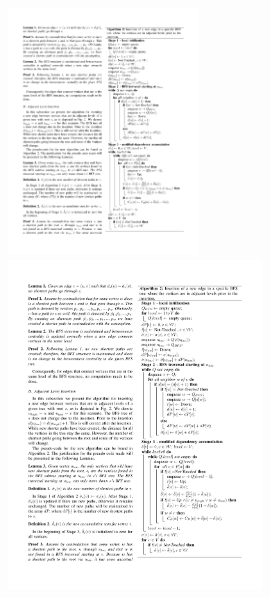 \begin{frame}
\begin{columns}[onlytextwidth]
    \begin{column}{0.7\textwidth}
      \begin{figure}[t]
        \centering
        \includegraphics[width=0.45\textwidth, height=0.8\textheight, keepaspectratio, valign=t]{imgs/green-algo1}
        \includegraphics[width=0.6\textwidth, height=0.8\textheight, keepaspectratio, valign=t]{imgs/green-algo2}
      \end{figure}
    \end{column}
  \end{columns}
\end{frame}



